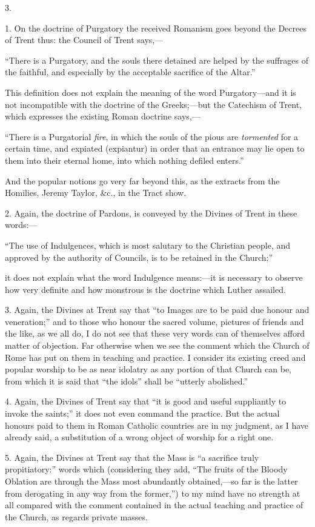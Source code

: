 3.

1. On the doctrine of Purgatory the received
Romanism goes beyond the Decrees of Trent thus: the Council of Trent
says,—

``There is a
Purgatory, and the souls there detained are helped by the suffrages of
the faithful, and especially by the acceptable sacrifice of the Altar.''

This definition does not explain the meaning of
the word Purgatory—and it is not incompatible with the doctrine of
the Greeks;—but the Catechism of Trent, which expresses the existing
Roman doctrine says,—

``There is a
Purgatorial \emph{fire}, in which the souls of the pious are \emph{tormented}
for a certain time, and expiated (expiantur) in order that an entrance
may lie open to them into their eternal home, into which nothing
defiled enters.''

And the popular notions go very far beyond this,
as the extracts from the Homilies, Jeremy Taylor, \&c., in the
Tract show.

2. Again, the doctrine of Pardons, is conveyed by
the Divines of Trent in these words:—

``The use of
Indulgences, which is most salutary to the Christian people, and
approved by the authority of Councils, is to be retained in the
Church;''

it does not explain what the word Indulgence
means:—it is necessary to observe how very definite and how monstrous
is the doctrine which Luther assailed.

3. Again, the Divines at Trent say that ``to
Images are to be paid due honour and veneration;'' and to those who
honour the sacred volume, pictures of friends and the like, as we all
do, I do not see that these very words can of themselves afford matter
of objection. Far otherwise when we see the comment which the
Church of Rome has put on them in teaching and practice. I consider
its existing creed and popular worship to be as near idolatry as any
portion of that Church can be, from which it is said that ``the idols''
shall be ``utterly abolished.''

4. Again, the Divines of Trent say that ``it is
good and useful suppliantly to invoke the saints;'' it does not even
command the practice. But the actual honours paid to them in Roman
Catholic countries are in my judgment, as I have already said, a
substitution of a wrong object of worship for a right one.

5. Again, the Divines at Trent say that the Mass
is ``a sacrifice truly propitiatory:'' words which (considering they
add, ``The fruits of the Bloody Oblation are through the Mass most
abundantly obtained,—so far is the latter from derogating in any way
from the former,'') to my mind have no strength at all compared with
the comment contained in the actual teaching and practice of the
Church, as regards private masses.

